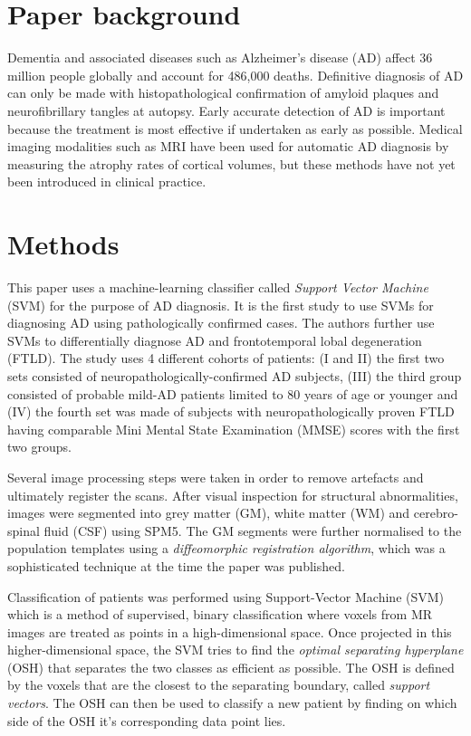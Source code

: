 \documentclass[11pt,a4paper,oneside]{report}
\begin{document}
\section*{Paper background}

Dementia and associated diseases such as Alzheimer's disease (AD) affect 36 million people globally\cite{world2012dementia} and account for 486,000 deaths\cite{lozano2013global}. Definitive diagnosis of AD can only be made with histopathological confirmation of amyloid plaques and neurofibrillary tangles at autopsy. Early accurate detection of AD is important because the treatment is most effective if undertaken as early as possible. Medical imaging modalities such as MRI have been used for automatic AD diagnosis by measuring the atrophy rates of cortical volumes\cite{fox2004imaging,barnes2004differentiating,wahlund2005evidence}, but these methods have not yet been introduced in clinical practice.

\section*{Methods}

This paper uses a machine-learning classifier called \emph{Support Vector Machine} (SVM) for the purpose of AD diagnosis.\cite{kloppel2008automatic} It is the first study to use SVMs for diagnosing AD using pathologically confirmed cases. The authors further use SVMs to differentially diagnose AD and frontotemporal lobal degeneration (FTLD). The study uses 4 different cohorts of patients: (I and II) the first two sets consisted of neuropathologically-confirmed AD subjects, (III) the third group consisted of probable mild-AD patients limited to 80 years of age or younger and (IV) the fourth set was made of subjects with neuropathologically proven FTLD having comparable Mini Mental State Examination (MMSE) scores with the first two groups.

Several image processing steps were taken in order to remove artefacts and ultimately register the scans. After visual inspection for structural abnormalities, images were segmented into grey matter (GM), white matter (WM) and cerebro-spinal fluid (CSF) using SPM5\cite{SPM5}. The GM segments were further normalised to the population templates using a \emph{diffeomorphic registration algorithm}\cite{ashburner2007fast}, which was a sophisticated technique at the time the paper was published. 

Classification of patients was performed using Support-Vector Machine (SVM) which is a method of supervised, binary classification where voxels from MR images are treated as points in a high-dimensional space.\cite{vapnik1998statistical,bishop2006pattern} Once projected in this higher-dimensional space, the SVM tries to find the \emph{optimal separating hyperplane} (OSH) that separates the two classes as efficient as possible. The OSH is defined by the voxels that are the closest to the separating boundary, called \emph{support vectors}. The OSH can then be used to classify a new patient by finding on which side of the OSH it's corresponding data point lies. 
\end{document}
